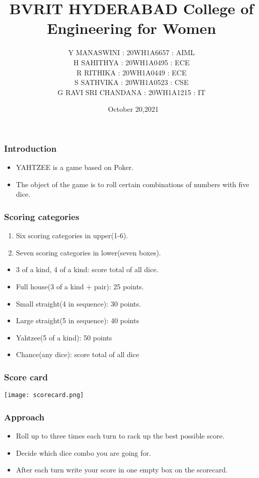 \documentclass[14pt]{beamer}
\title{BVRIT HYDERABAD College of Engineering for Women \\ {\color{magenta}{ YAHTZEE}}}
\subtitle{\color{magenta}{Team 19}}
\date{\ October 20,2021}
\author[Bvrith]{ Y MANASWINI : 20WH1A6657 : AIML \\ H SAHITHYA : 20WH1A0495 : ECE \\ R RITHIKA : 20WH1A0449 : ECE \\ S SATHVIKA : 20WH1A0523 : CSE \\ G RAVI SRI CHANDANA : 20WH1A1215 : IT}
\begin{document}
    \begin{frame}
        \titlepage
    \end{frame}
    \begin{frame}
	\frametitle{Introduction}
        \begin{itemize}
	    \item YAHTZEE is a game based on Poker.
	    \item The object of the game is to roll certain combinations  of numbers with five dice. 
	\end{itemize}
    \end{frame}

\begin{frame}
	\frametitle{Scoring categories}
	\begin{enumerate}
	    \item Six scoring categories in upper(1-6).
	    \item Seven scoring categories in lower(seven boxes).  
	\end{enumerate}
	\begin{itemize}
		\item 3 of a kind, 4 of a kind: score total of all dice.
		\item Full house(3 of a kind + pair): 25 points.
	\end{itemize}
\end{frame}

\begin{frame}
	\begin{itemize}
	   \item Small straight(4 in sequence): 30 points.
	    \item Large straight(5 in sequence): 40 points
	    \item Yahtzee(5 of a kind): 50 points
	    \item Chance(any dice): score total of all dice
	\end{itemize}
    \end{frame}
 \begin{frame}
	\frametitle{Score card}
\begin{center}
\texttt{[image: scorecard.png]}
\end{center}
\end{frame}

\begin{frame}
	\frametitle{Approach}
	\begin{itemize}
	    \item Roll up to three times each turn to rack up the best possible score.
	    \item Decide which dice combo you are going for.
	    \item After each turn write your score in one empty box on the scorecard.
	\end{itemize}
\end{frame}
\end{document}
